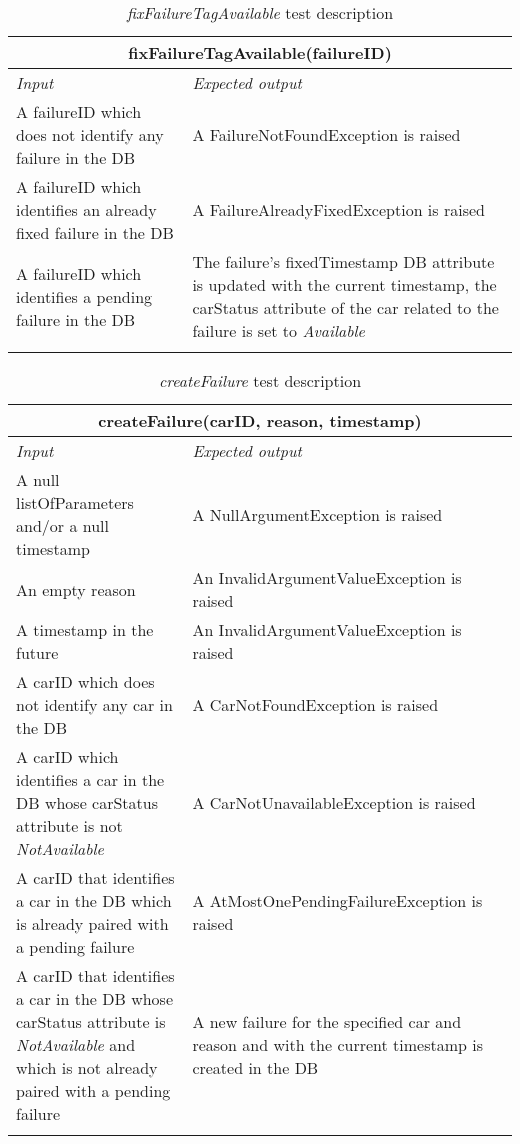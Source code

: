 \begin{longtable}{p{0.35\linewidth}p{0.65\linewidth}}
\multicolumn{2}{c}{\textbf{fixFailureTagAvailable(failureID)}} \\
\toprule
\emph{Input} & \emph{Expected output} \\
\midrule
A failureID which does not identify any failure in the DB & A FailureNotFoundException is raised\\
\midrule
A failureID which identifies an already fixed failure in the DB & A FailureAlreadyFixedException is raised\\
\midrule
A failureID which identifies a pending failure in the DB & The failure's fixedTimestamp DB attribute is updated with the current timestamp, the carStatus attribute of the car related to the failure is set to \emph{Available}\\
\bottomrule
\caption{\emph{fixFailureTagAvailable} test description}
\end{longtable}

\begin{longtable}{p{0.35\linewidth}p{0.65\linewidth}}
\multicolumn{2}{c}{\textbf{createFailure(carID, reason, timestamp)}} \\
\toprule
\emph{Input} & \emph{Expected output} \\
\midrule
A null listOfParameters and/or a null timestamp & A NullArgumentException is raised\\
\midrule
An empty reason & An InvalidArgumentValueException is raised \\
\midrule
A timestamp in the future & An InvalidArgumentValueException is raised \\
\midrule
A carID which does not identify any car in the DB & A CarNotFoundException is raised\\
\midrule
A carID which identifies a car in the DB whose carStatus attribute is not \emph{NotAvailable} & A CarNotUnavailableException is raised\\
\midrule
A carID that identifies a car in the DB which is already paired with a pending failure & A AtMostOnePendingFailureException is raised\\
\midrule
A carID that identifies a car in the DB whose carStatus attribute is \emph{NotAvailable} and which is not already paired with a pending failure & A new failure for the specified car and reason and with the current timestamp is created in the DB\\
\bottomrule
\caption{\emph{createFailure} test description}
\end{longtable}

